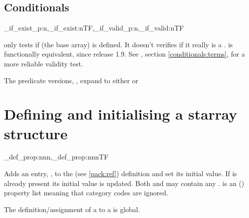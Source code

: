 \documentclass[10pt]{article}
\begin{document}
\subsection{Conditionals}\label{conditionals:exist}
\begin{codedescribe}[code,EXP,new=2023/05/20,update=2024/03/28]{\starray_if_exist_p:n,\starray_if_exist:nTF,\starray_if_valid_p:n,\starray_if_valid:nTF}
\begin{codesyntax}%
\end{codesyntax}
 only tests if  (the base array) is defined. It doesn't verifies if it really is a  .  is functionally equivalent, since release 1.9. See , section \ref{conditionals:terms}, for a more reliable validity test.
\end{codedescribe}
\begin{tsremark}
The predicate versions, , expand to either  or\break  {}
\end{tsremark}

\section{Defining and initialising a starray structure}\label{pack:def}

\begin{codedescribe}{\starray_def_prop:nnn,\starray_def_prop:nnnTF}
\begin{codesyntax}%
\end{codesyntax}
Adds an entry, , to the  (see \ref{pack:ref}) definition and set its initial value. If  is already present its initial value is updated. Both  and  may contain any .  is an (\cite{expl3}) property list  meaning that category codes are ignored.

The definition/assignment of a  to a  is global.
\end{codedescribe}
\end{document}
